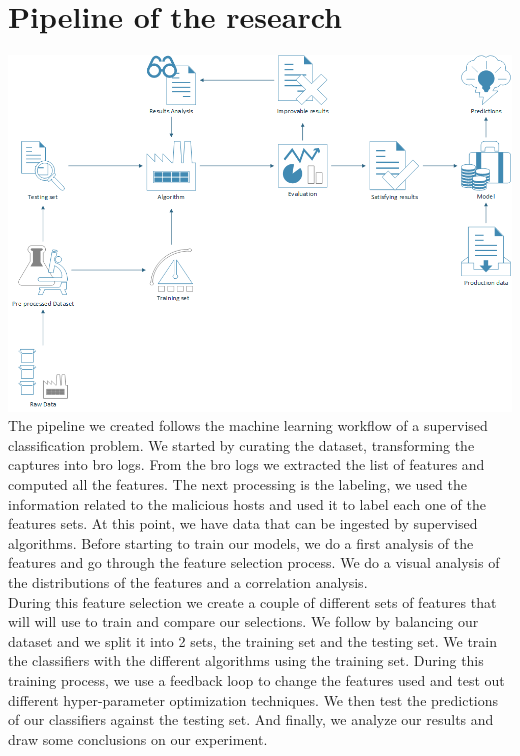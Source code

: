 \section{Pipeline of the research}
\includegraphics[scale=.55]{img/pers_ml_workflow.png}
The pipeline we created follows the machine learning workflow of a supervised classification problem. We started by curating the dataset, transforming the captures into bro logs. From the bro logs we extracted the list of features and computed all the features. The next processing is the labeling, we used the information related to the malicious hosts and used it to label each one of the features sets. At this point, we have data that can be ingested by supervised algorithms. Before starting to train our models, we do a first analysis of the features and go through the feature selection process. We do a visual analysis of the distributions of the features and a correlation analysis. \\
During this feature selection we create a couple of different sets of features that will will use to train and compare our selections.
We follow by balancing our dataset and we split it into 2 sets, the training set and the testing set. 
We train the classifiers with the different algorithms using the training set. During this training process, we use a feedback loop to change the features used and test out different hyper-parameter optimization techniques. We then test the predictions of our classifiers against the testing set. And finally, we analyze our results and draw some conclusions on our experiment.
